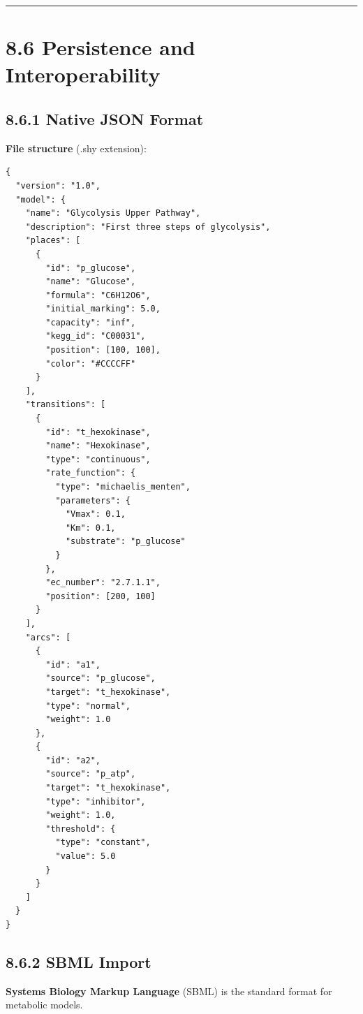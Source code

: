 \begin{center}\rule{0.5\linewidth}{0.5pt}\end{center}

\hypertarget{persistence-and-interoperability}{%
\section{8.6 Persistence and
Interoperability}\label{persistence-and-interoperability}}

\hypertarget{native-json-format}{%
\subsection{8.6.1 Native JSON Format}\label{native-json-format}}

\textbf{File structure} (.shy extension):

\begin{lstlisting}
{
  "version": "1.0",
  "model": {
    "name": "Glycolysis Upper Pathway",
    "description": "First three steps of glycolysis",
    "places": [
      {
        "id": "p_glucose",
        "name": "Glucose",
        "formula": "C6H12O6",
        "initial_marking": 5.0,
        "capacity": "inf",
        "kegg_id": "C00031",
        "position": [100, 100],
        "color": "#CCCCFF"
      }
    ],
    "transitions": [
      {
        "id": "t_hexokinase",
        "name": "Hexokinase",
        "type": "continuous",
        "rate_function": {
          "type": "michaelis_menten",
          "parameters": {
            "Vmax": 0.1,
            "Km": 0.1,
            "substrate": "p_glucose"
          }
        },
        "ec_number": "2.7.1.1",
        "position": [200, 100]
      }
    ],
    "arcs": [
      {
        "id": "a1",
        "source": "p_glucose",
        "target": "t_hexokinase",
        "type": "normal",
        "weight": 1.0
      },
      {
        "id": "a2",
        "source": "p_atp",
        "target": "t_hexokinase",
        "type": "inhibitor",
        "weight": 1.0,
        "threshold": {
          "type": "constant",
          "value": 5.0
        }
      }
    ]
  }
}
\end{lstlisting}

\hypertarget{sbml-import}{%
\subsection{8.6.2 SBML Import}\label{sbml-import}}

\textbf{Systems Biology Markup Language} (SBML) is the standard format
for metabolic models.


